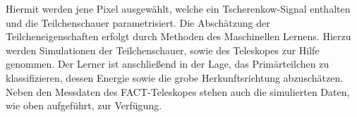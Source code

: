 Hiermit werden jene Pixel ausgewählt, welche ein Tscherenkow-Signal enthalten und die Teilchenschauer parametrisiert. Die Abschätzung der Teilcheneigenschaften erfolgt durch Methoden des Maschinellen Lernens. Hierzu werden Simulationen der Teilchenschauer, sowie des Teleskopes zur Hilfe genommen. Der Lerner ist anschließend in der Lage, das Primärteilchen zu klassifizieren, dessen Energie sowie die grobe Herkunftsrichtung abzuschätzen. Neben den Messdaten des FACT-Teleskopes stehen auch die simulierten Daten, wie oben aufgeführt, zur Verfügung.
